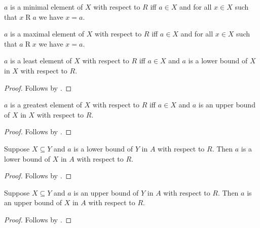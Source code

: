 \begin{definition}\label{minimal_element}
    $a$ is a minimal element of $X$ with respect to $R$ iff
        $a\in X$ and for all $x\in X$ such that $x\mathrel{R}a$ we have
            $x=a$.
\end{definition}

\begin{definition}\label{maximal_element}
    $a$ is a maximal element of $X$ with respect to $R$ iff
        $a\in X$ and for all $x\in X$ such that $a\mathrel{R}x$ we have
            $x=a$.
\end{definition}

\begin{proposition}\label{least_iff_lower_bound_in_self}
    $a$ is a least element of $X$ with respect to $R$ iff
        $a\in X$ and $a$ is a lower bound of $X$ in $X$ with respect to $R$.
\end{proposition}
\begin{proof}
    Follows by .
\end{proof}

\begin{proposition}\label{greatest_iff_upper_bound_in_self}
    $a$ is a greatest element of $X$ with respect to $R$ iff
        $a\in X$ and $a$ is an upper bound of $X$ in $X$ with respect to $R$.
\end{proposition}
\begin{proof}
    Follows by .
\end{proof}

\begin{proposition}\label{lower_bound_antitone}
    Suppose $X\subseteq Y$ and
        $a$ is a lower bound of $Y$ in $A$ with respect to $R$.
    Then $a$ is a lower bound of $X$ in $A$ with respect to $R$.
\end{proposition}
\begin{proof}
    Follows by .
\end{proof}

\begin{proposition}\label{upper_bound_antitone}
    Suppose $X\subseteq Y$ and
        $a$ is an upper bound of $Y$ in $A$ with respect to $R$.
    Then $a$ is an upper bound of $X$ in $A$ with respect to $R$.
\end{proposition}
\begin{proof}
    Follows by .
\end{proof}

